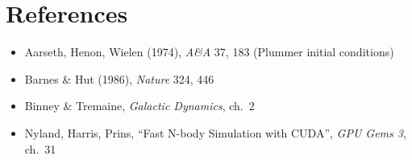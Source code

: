 \section*{References}
\begin{itemize}
\item Aarseth, Henon, Wielen (1974), \textit{A\&A} 37, 183 (Plummer initial conditions)
\item Barnes \& Hut (1986), \textit{Nature} 324, 446
\item Binney \& Tremaine, \textit{Galactic Dynamics}, ch.\ 2
\item Nyland, Harris, Prins, ``Fast N-body Simulation with CUDA'', \textit{GPU Gems 3}, ch.\ 31
\end{itemize}

